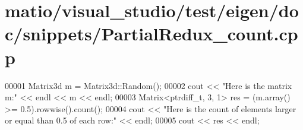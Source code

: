 \hypertarget{matio_2visual__studio_2test_2eigen_2doc_2snippets_2_partial_redux__count_8cpp_source}{}\section{matio/visual\+\_\+studio/test/eigen/doc/snippets/\+Partial\+Redux\+\_\+count.cpp}
\label{matio_2visual__studio_2test_2eigen_2doc_2snippets_2_partial_redux__count_8cpp_source}

\begin{DoxyCode}
00001 Matrix3d m = Matrix3d::Random();
00002 cout << \textcolor{stringliteral}{"Here is the matrix m:"} << endl << m << endl;
00003 Matrix<ptrdiff\_t, 3, 1> res = (m.array() >= 0.5).rowwise().count();
00004 cout << \textcolor{stringliteral}{"Here is the count of elements larger or equal than 0.5 of each row:"} << endl;
00005 cout << res << endl;
\end{DoxyCode}
